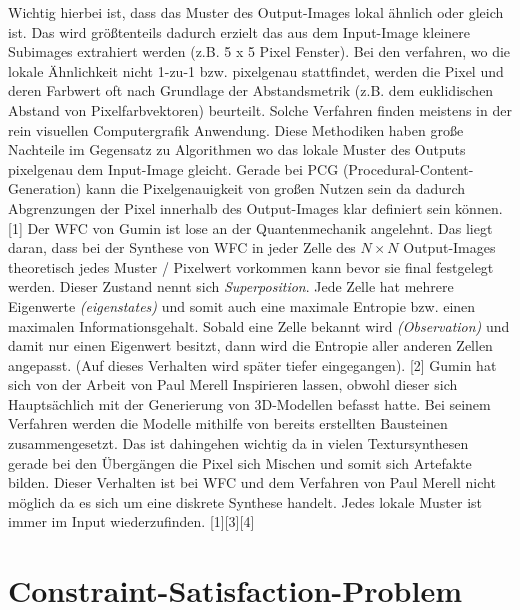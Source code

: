 \documentclass[12pt]{report}
\begin{document}
\noindent Wichtig hierbei ist, dass das Muster des Output-Images lokal ähnlich oder gleich ist.
Das wird größtenteils dadurch erzielt das aus dem Input-Image kleinere Subimages extrahiert werden {(z.B. 5 x 5 Pixel Fenster)}.
Bei den verfahren, wo die lokale Ähnlichkeit nicht 1-zu-1 bzw. pixelgenau stattfindet, werden die Pixel und deren Farbwert oft nach Grundlage der Abstandsmetrik {(z.B. dem euklidischen Abstand von Pixelfarbvektoren)} beurteilt.
Solche Verfahren finden meistens in der rein visuellen Computergrafik Anwendung.
Diese Methodiken haben große Nachteile im Gegensatz zu Algorithmen wo das lokale Muster des Outputs pixelgenau dem Input-Image gleicht.
Gerade bei PCG {(Procedural-Content-Generation)} kann die Pixelgenauigkeit von großen Nutzen sein da dadurch Abgrenzungen der Pixel innerhalb des Output-Images klar definiert sein können.
{[1]}
Der WFC von Gumin ist lose an der Quantenmechanik angelehnt.
Das liegt daran, dass bei der Synthese von WFC in jeder Zelle des $N\times N$ Output-Images theoretisch jedes Muster / Pixelwert vorkommen kann bevor sie final festgelegt werden.
Dieser Zustand nennt sich \textit{Superposition}.
Jede Zelle hat mehrere Eigenwerte \textit{(eigenstates)} und somit auch eine maximale Entropie bzw. einen maximalen Informationsgehalt.
Sobald eine Zelle bekannt wird \textit{(Observation)} und damit nur einen Eigenwert besitzt, dann wird die Entropie aller anderen Zellen angepasst.
{(Auf dieses Verhalten wird später tiefer eingegangen)}. {[2]}
Gumin hat sich von der Arbeit von Paul Merell Inspirieren lassen, obwohl dieser sich Hauptsächlich mit der Generierung von 3D-Modellen befasst hatte.
Bei seinem Verfahren werden die Modelle mithilfe von bereits erstellten Bausteinen zusammengesetzt.
Das ist dahingehen wichtig da in vielen Textursynthesen gerade bei den Übergängen die Pixel sich Mischen und somit sich Artefakte bilden.
Dieser Verhalten ist bei WFC und dem Verfahren von Paul Merell nicht möglich da es sich um eine diskrete Synthese handelt.
Jedes lokale Muster ist immer im Input wiederzufinden. {[1]}{[3]}{[4]}

\section{Constraint-Satisfaction-Problem}
\end{document}
